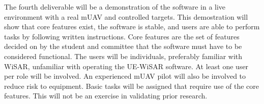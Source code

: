 The fourth deliverable will be a demonstration of the software in a
live environment with a real mUAV and controlled targets.  This demostration
will show that core features exist, the software is stable, and users are able to perform tasks by following written
instructions.  Core features are the set of features decided on by the student
and committee that the software must have to be considered functional.  The
users will be individuals, preferably familiar with WiSAR, unfamiliar with
operating the UE-WiSAR software.  At least one user per role will be involved. 
An experienced mUAV pilot will also be involved to reduce risk to equipment. 
Basic tasks will be assigned that require use of the core features.  This will
not be an exercise in validating prior research.

% 
% 
